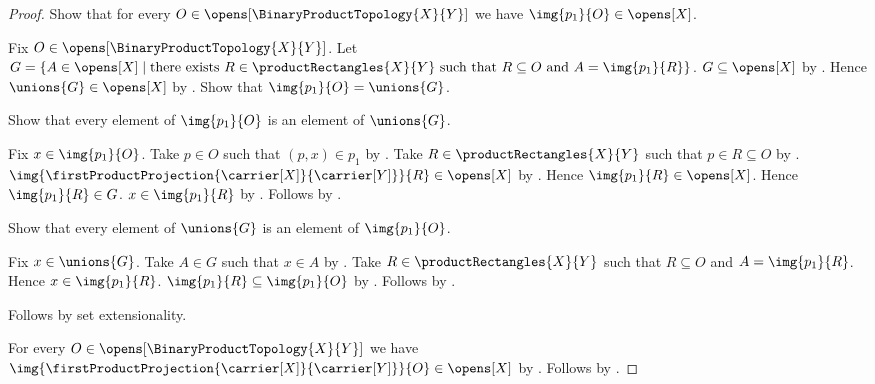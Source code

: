 \begin{proof}
    Show that for every $O\in\opens[\BinaryProductTopology{X}{Y}]$
        we have $\img{p_1}{O}\in\opens[X]$.
    \begin{subproof}
        Fix $O\in\opens[\BinaryProductTopology{X}{Y}]$.
        Let $G=\{A\in\opens[X]\mid
            \text{there exists $R\in\productRectangles{X}{Y}$ such that
                $R\subseteq O$ and $A=\img{p_1}{R}$}\}$.
        $G\subseteq\opens[X]$ by .
        Hence $\unions{G}\in\opens[X]$ by .
        Show that $\img{p_1}{O}=\unions{G}$.
        \begin{subproof}
            Show that every element of $\img{p_1}{O}$ is an element of
                $\unions{G}$.
            \begin{subproof}
                Fix $x\in\img{p_1}{O}$.
                Take $p\in O$ such that $(p,x)\in p_1$ by .
                Take $R\in\productRectangles{X}{Y}$ such that
                    $p\in R\subseteq O$ by .
                $\img{\firstProductProjection{
                    \carrier[X]}{\carrier[Y]}}{R}\in\opens[X]$ by
                    .
                Hence $\img{p_1}{R}\in\opens[X]$.
                Hence $\img{p_1}{R}\in G$.
                $x\in\img{p_1}{R}$ by .
                Follows by .
            \end{subproof}
            Show that every element of $\unions{G}$ is an element of
                $\img{p_1}{O}$.
            \begin{subproof}
                Fix $x\in\unions{G}$.
                Take $A\in G$ such that $x\in A$ by .
                Take $R\in\productRectangles{X}{Y}$ such that
                    $R\subseteq O$ and $A=\img{p_1}{R}$.
                Hence $x\in\img{p_1}{R}$.
                $\img{p_1}{R}\subseteq\img{p_1}{O}$ by
                    .
                Follows by .
            \end{subproof}
            Follows by set extensionality.
        \end{subproof}
    \end{subproof}
    For every $O\in\opens[\BinaryProductTopology{X}{Y}]$ we have
        $\img{\firstProductProjection{
            \carrier[X]}{\carrier[Y]}}{O}\in\opens[X]$ by
        \auto.
    Follows by .
\end{proof}

